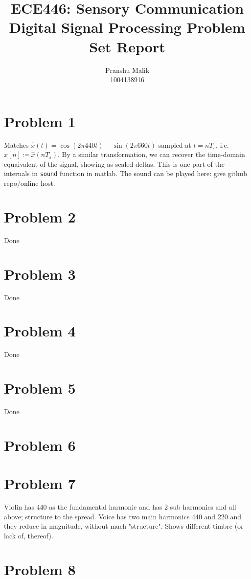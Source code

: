 \documentclass[10pt]{article}
\date{}
\begin{document}
\title{\textbf{\Large{\textsc{ECE446:} Sensory Communication}} \\ \Large{Digital Signal Processing Problem Set Report}\vspace{-0.3cm}}
\author{Pranshu Malik\\ \footnotesize{1004138916}\vspace{-3cm}}

\maketitle

\section{Problem 1}
Matches $\hat{x}(t) = \cos(2\pi440t) - \sin(2\pi660t)$ sampled at $t = nT_s$, i.e. $\hat{x}[n] \coloneqq \hat{x}(nT_s)$. By a similar transformation, we can recover the time-domain equaivalent of the signal, showing as scaled deltas. This is one part of the internals in \texttt{sound} function in matlab. The sound can be played here: give github repo/online host.

\section{Problem 2}
Done

\section{Problem 3}
Done
\section{Problem 4}
Done
\section{Problem 5}
Done
\section{Problem 6}
\section{Problem 7}
Violin has 440 as the fundamental harmonic and has 2 sub harmonics and all above; structure to the spread. Voice has two main harmonics 440 and 220 and they reduce in magnitude, without much "structure". Shows different timbre (or lack of, thereof).
\section{Problem 8}
\end{document}
